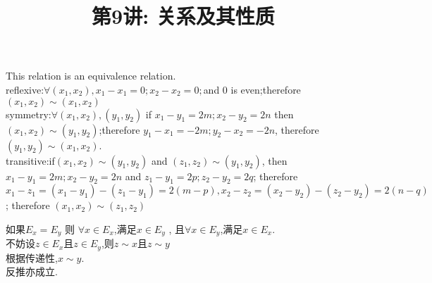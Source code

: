 \documentclass[a4paper, justified]{tufte-handout}
\title{第9讲: 关系及其性质}
\date{\zhtoday} %
\begin{document}
\maketitle
\noplagiarism %
\begin{abstract}
  \begin{center}{}
  \end{center}
\end{abstract}
\beginrequired

\begin{problem}[UD Problem 10.9]
\end{problem}

\begin{solution}
  This relation is an equivalence relation.\\
  reflexive:$\forall (x_1, x_2), x_1 - x_1 = 0;x_2 - x_2 = 0;$and 0 is even;therefore $(x_1, x_2)\sim(x_1, x_2)$\\
  symmetry:$\forall (x_1, x_2),(y_1, y_2)$ if $x_1 - y_1 = 2m; x_2 - y_2 = 2n$ then $(x_1, x_2)\sim(y_1, y_2)$;therefore $ y_1 - x_1 = -2m; y_2 - x_2 = -2n$, therefore $(y_1, y_2)\sim(x_1, x_2)$.\\
  transitive:if$(x_1, x_2)\sim(y_1, y_2)$ and $(z_1, z_2)\sim(y_1, y_2)$, then $x_1 - y_1 = 2m; x_2 - y_2 = 2n$ and $z_1 - y_1 = 2p; z_2 - y_2 = 2q$; therefore $x_1 - z_1 = (x_1 - y_1) - (z_1 - y_1) = 2(m - p), x_2 - z_2 = (x_2 - y_2) - (z_2 - y_2) = 2(n - q)$; therefore $(x_1, x_2)\sim(z_1, z_2)$
\end{solution}

\begin{problem}[UD Problem 10.10]
\end{problem}

\begin{solution}
  如果$E_x = E_y$ 则 $\forall x \in E_x$,满足$x \in E_y$ , 且$\forall x \in E_y$,满足$x \in E_x$.\\
  不妨设$z \in E_x$且$z \in E_y$,则$z\sim x$且$z\sim y$\\
  根据传递性,$x\sim y$.\\
  反推亦成立.
\end{solution}
\end{document}

